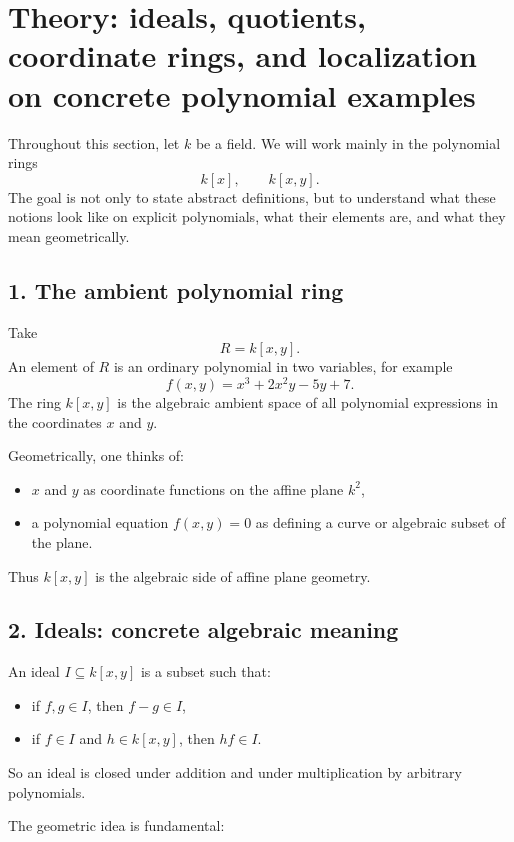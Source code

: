 \documentclass[12pt,a4paper]{article}
\theoremstyle{plain}
\theoremstyle{definition}      %
\begin{document}
	
	\section*{Theory: ideals, quotients, coordinate rings, and localization on concrete polynomial examples}
	
	Throughout this section, let \(k\) be a field. We will work mainly in the polynomial rings
	\[
	k[x], \qquad k[x,y].
	\]
	The goal is not only to state abstract definitions, but to understand what these notions look like on explicit polynomials, what their elements are, and what they mean geometrically.
	
	\subsection*{1. The ambient polynomial ring}
	
	Take
	\[
	R = k[x,y].
	\]
	An element of \(R\) is an ordinary polynomial in two variables, for example
	\[
	f(x,y)=x^3+2x^2y-5y+7.
	\]
	The ring \(k[x,y]\) is the algebraic ambient space of all polynomial expressions in the coordinates \(x\) and \(y\).
	
	Geometrically, one thinks of:
	\begin{itemize}
		\item \(x\) and \(y\) as coordinate functions on the affine plane \(k^2\),
		\item a polynomial equation \(f(x,y)=0\) as defining a curve or algebraic subset of the plane.
	\end{itemize}
	
	Thus \(k[x,y]\) is the algebraic side of affine plane geometry.
	
	\subsection*{2. Ideals: concrete algebraic meaning}
	
	An ideal \(I \subseteq k[x,y]\) is a subset such that:
	\begin{itemize}
		\item if \(f,g\in I\), then \(f-g\in I\),
		\item if \(f\in I\) and \(h\in k[x,y]\), then \(hf\in I\).
	\end{itemize}
	
	So an ideal is closed under addition and under multiplication by arbitrary polynomials.
	
	The geometric idea is fundamental:
	
\end{document}

